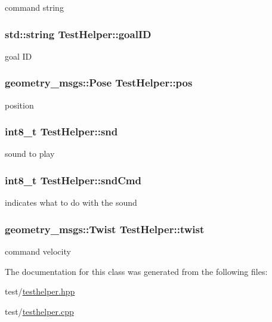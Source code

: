 command string 

\hypertarget{classTestHelper_a3d1422616cebc2df38b8766f42864f43}{
\subsubsection[{goal\-I\-D}]{\setlength{\rightskip}{0pt plus 5cm}std\-::string Test\-Helper\-::goal\-I\-D}}\label{classTestHelper_a3d1422616cebc2df38b8766f42864f43}


goal I\-D 

\hypertarget{classTestHelper_a095ebfa14c22f6057c1385a70f65b9b6}{
\subsubsection[{pos}]{\setlength{\rightskip}{0pt plus 5cm}geometry\-\_\-msgs\-::\-Pose Test\-Helper\-::pos}}\label{classTestHelper_a095ebfa14c22f6057c1385a70f65b9b6}


position 

\hypertarget{classTestHelper_a299ac5a385d8e910a22980601f9ad4c4}{
\subsubsection[{snd}]{\setlength{\rightskip}{0pt plus 5cm}int8\-\_\-t Test\-Helper\-::snd}}\label{classTestHelper_a299ac5a385d8e910a22980601f9ad4c4}


sound to play 

\hypertarget{classTestHelper_ab91e5c0bcd313b9e629b389bbecabb90}{
\subsubsection[{snd\-Cmd}]{\setlength{\rightskip}{0pt plus 5cm}int8\-\_\-t Test\-Helper\-::snd\-Cmd}}\label{classTestHelper_ab91e5c0bcd313b9e629b389bbecabb90}


indicates what to do with the sound 

\hypertarget{classTestHelper_a78a826fd3e1a4bc10adc910cde81668d}{
\subsubsection[{twist}]{\setlength{\rightskip}{0pt plus 5cm}geometry\-\_\-msgs\-::\-Twist Test\-Helper\-::twist}}\label{classTestHelper_a78a826fd3e1a4bc10adc910cde81668d}


command velocity 



The documentation for this class was generated from the following files\-:\begin{DoxyCompactItemize}
\item 
test/\hyperlink{testhelper_8hpp}{testhelper.\-hpp}\item 
test/\hyperlink{testhelper_8cpp}{testhelper.\-cpp}\end{DoxyCompactItemize}

